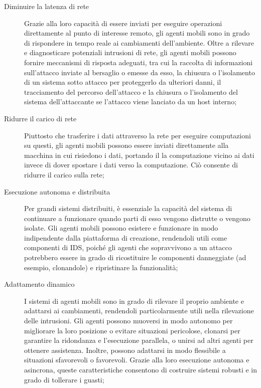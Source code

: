 \begin{description}
    \item [Diminuire la latenza di rete] Grazie alla loro capacità di essere inviati per eseguire operazioni direttamente al punto di interesse remoto, gli agenti mobili sono in grado di rispondere in tempo reale ai cambiamenti dell'ambiente. Oltre a rilevare e diagnosticare potenziali intrusioni di rete, gli agenti mobili possono fornire meccanismi di risposta adeguati, tra cui la raccolta di informazioni sull'attacco inviate al bersaglio o emesse da esso, la chiusura o l'isolamento di un sistema sotto attacco per proteggerlo da ulteriori danni, il tracciamento del percorso dell'attacco e la chiusura o l'isolamento del sistema dell'attaccante se l'attacco viene lanciato da un host interno;
    \item[Ridurre il carico di rete] Piuttosto che trasferire i dati attraverso la rete per eseguire computazioni su questi, gli agenti mobili possono essere inviati direttamente alla macchina in cui risiedono i dati, portando il la computazione vicino ai dati invece di dover spostare i dati  verso la computazione. Ciò consente di ridurre il carico sulla rete;%
    \item [Esecuzione autonoma e distribuita] Per grandi sistemi distribuiti, è essenziale la capacità del sistema di continuare a funzionare quando parti di esso vengono distrutte o vengono isolate. Gli agenti mobili possono esistere e funzionare in modo indipendente dalla piattaforma di creazione, rendendoli utili come componenti di IDS, poiché gli agenti che sopravvivono a un attacco potrebbero essere in grado di ricostituire le componenti danneggiate (ad esempio, clonandole) e ripristinare la funzionalità;
    \item [Adattamento dinamico] I sistemi di agenti mobili sono in grado di rilevare il proprio ambiente e adattarsi ai cambiamenti, rendendoli particolarmente utili nella rilevazione delle intrusioni. Gli agenti possono muoversi in modo autonomo per migliorare la loro posizione o evitare situazioni pericolose, clonarsi per garantire la ridondanza e l'esecuzione parallela, o unirsi ad altri agenti per ottenere assistenza. Inoltre, possono adattarsi in modo flessibile a situazioni sfavorevoli o favorevoli. Grazie alla loro esecuzione autonoma e asincrona, queste caratteristiche consentono di costruire sistemi robusti e in grado di tollerare i guasti;

\end{description}
